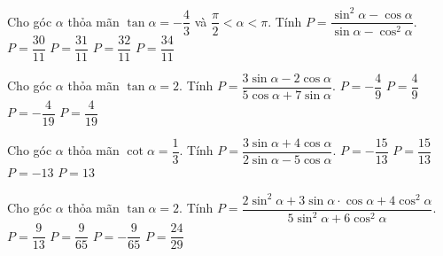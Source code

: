 \begin{ex}%
Cho góc $\alpha $ thỏa mãn $\tan \alpha =-\dfrac{4}{3}$ và $\dfrac{\pi}{2}<\alpha <\pi $. Tính $P=\dfrac{{{\sin}^2\alpha-\cos \alpha}}{{\sin \alpha-{\cos}^2\alpha}}.$ 
\choice
{$P=\dfrac{{30}}{{11}}$}
{\True $P=\dfrac{{31}}{{11}}$}
{$P=\dfrac{{32}}{{11}}$}
{$P=\dfrac{{34}}{{11}}$}
\end{ex}

\begin{ex}%
Cho góc $\alpha $ thỏa mãn $\tan \alpha =2.$ Tính $P=\dfrac{{3\sin \alpha-2\cos \alpha}}{{5\cos \alpha+7\sin \alpha}}.$ 
\choice
{$P=-\dfrac{4}{9}$}
{$P=\dfrac{4}{9}$}
{$P=-\dfrac{4}{{19}}$}
{\True $P=\dfrac{4}{{19}}$}
\end{ex}

\begin{ex}%
Cho góc $\alpha $ thỏa mãn $\cot\alpha =\dfrac{1}{3}.$ Tính $P=\dfrac{{3\sin \alpha+4\cos \alpha}}{{2\sin \alpha-5\cos \alpha}}.$ 
\choice
{$P=-\dfrac{{15}}{{13}}$}
{$P=\dfrac{{15}}{{13}}$}
{$P=-13$}
{\True $P=13$}
\end{ex}

\begin{ex}%
Cho góc $\alpha $ thỏa mãn $\tan\alpha =2.$ Tính $P=\dfrac{{2{\sin}^2\alpha+3\sin \alpha \cdot\cos \alpha+4{\cos}^2\alpha}}{{5{\sin}^2\alpha+6{\cos}^2\alpha}}.$ 
\choice
{\True $P=\dfrac{9}{{13}}$}
{$P=\dfrac{9}{{65}}$}
{$P=-\dfrac{9}{{65}}$}
{$P=\dfrac{{24}}{{29}}$}
\end{ex}

